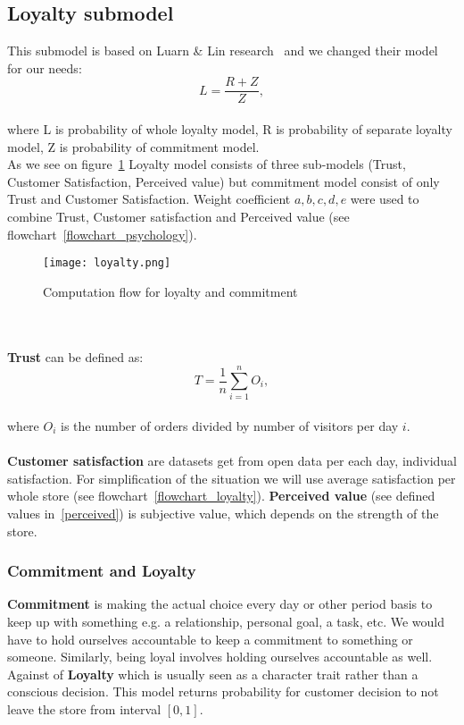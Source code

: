 \subsection{Loyalty submodel} \label{subsec:model_loyalty}
This submodel is based on Luarn \& Lin research~\cite{luarn} and we changed their model for our needs:\\
\begin{equation} \label{eq:19}
L = \frac{R+Z}{Z},
\end{equation}
\\
where L is probability of whole loyalty model, R is probability of separate loyalty model, Z is probability of commitment model.
\\
As we see on figure~\ref{Loyalty scheme} Loyalty model consists of three sub-models (Trust, Customer Satisfaction, Perceived value)
but commitment model consist of only Trust and Customer Satisfaction.
Weight coefficient $a,b,c,d,e$ were used to combine Trust, Customer satisfaction and Perceived value (see flowchart~\ref{flowchart_psychology}).\\
\begin{figure}[h!]
    \begin{center}
        \texttt{[image: loyalty.png]}
    \end{center}
    \caption{Computation flow for loyalty and commitment~\cite{luarn}}
    \label{Loyalty scheme}
\end{figure}\\
\\
\textbf{Trust} can be defined as:\\
\begin{equation} \label{eq:20}
T = \frac{1}{n} \sum_{i=1}^{n} O_i,
\end{equation}
\\
where $O_i$ is the number of orders divided by number of visitors per day $i$.
\\
\\
\textbf{Customer satisfaction} are datasets get from open data per each day, individual satisfaction.
For simplification of the situation we will use average satisfaction per whole store (see flowchart~\ref{flowchart_loyalty}).
\textbf{Perceived value} (see defined values in~\ref{perceived}) is subjective value, which depends on the strength of the store.
\subsubsection{Commitment and Loyalty} \label{subsubsec:model_loyalty_commitment}
\textbf{Commitment} is making the actual choice every day or other period basis to keep up with something e.g. a relationship, personal goal, a task, etc.
We would have to hold ourselves accountable to keep a commitment to something or someone.
Similarly, being loyal involves holding ourselves accountable as well.\\
Against of \textbf{Loyalty} which is usually seen as a character trait rather than a conscious decision.
This model returns probability for customer decision to not leave the store from interval $[0,1]$.\\
